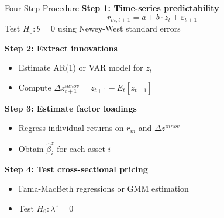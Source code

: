 \documentclass{beamer}
\begin{document}
\begin{frame}{Four-Step Procedure}
\textbf{Step 1: Time-series predictability}
$$r_{m,t+1} = a + b \cdot z_t + \varepsilon_{t+1}$$
Test $H_0: b = 0$ using Newey-West standard errors

\vspace{0.3cm}
\textbf{Step 2: Extract innovations}
\begin{itemize}
\item Estimate AR(1) or VAR model for $z_t$
\item Compute $\Delta z_{t+1}^{innov} = z_{t+1} - E_t[z_{t+1}]$
\end{itemize}

\vspace{0.3cm}
\textbf{Step 3: Estimate factor loadings}
\begin{itemize}
\item Regress individual returns on $r_m$ and $\Delta z^{innov}$
\item Obtain $\hat{\beta}_i^z$ for each asset $i$
\end{itemize}

\vspace{0.3cm}
\textbf{Step 4: Test cross-sectional pricing}
\begin{itemize}
\item Fama-MacBeth regressions or GMM estimation
\item Test $H_0: \lambda^z = 0$
\end{itemize}
\end{frame}
\end{document}
